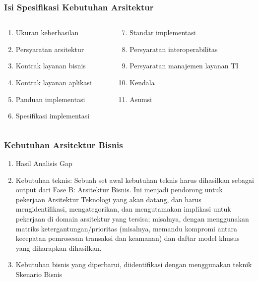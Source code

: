 \documentclass[aspectratio=169]{beamer}
\begin{document}
	\begin{frame}
		\frametitle{Isi Spesifikasi Kebutuhan Arsitektur}
		\begin{columns}
			\begin{column}{0.5\textwidth}
				\begin{center}
					\begin{enumerate}
						\item Ukuran keberhasilan
						\item Persyaratan arsitektur
						\item Kontrak layanan bisnis
						\item Kontrak layanan aplikasi
						\item Panduan implementasi
						\item Spesifikasi implementasi
						
					\end{enumerate}
				\end{center}
			\end{column}
			\begin{column}{0.5\textwidth}
				\begin{center}
					\begin{enumerate}
						\setcounter{enumi}{6}
						\item Standar implementasi
						\item Persyaratan interoperabilitas
						\item Persyaratan manajemen layanan TI
						\item Kendala
						\item Asumsi
					\end{enumerate}
				\end{center}
			\end{column}
		\end{columns}
	\end{frame}
	
		\begin{frame}
		\frametitle{Kebutuhan Arsitektur Bisnis}
		\begin{enumerate}
			\item Hasil Analisis Gap
			\item Kebutuhan teknis: Sebuah set awal kebutuhan teknis harus dihasilkan sebagai output dari Fase B: Arsitektur Bisnis. Ini menjadi pendorong untuk pekerjaan Arsitektur Teknologi yang akan datang, dan harus mengidentifikasi, mengategorikan, dan mengutamakan implikasi untuk pekerjaan di domain arsitektur yang tersisa; misalnya, dengan menggunakan matriks ketergantungan/prioritas (misalnya, memandu kompromi antara kecepatan pemrosesan transaksi dan keamanan) dan daftar model khusus yang diharapkan dihasilkan.
			\item Kebutuhan bisnis yang diperbarui, diidentifikasi dengan menggunakan teknik Skenario Bisnis
		\end{enumerate}
	\end{frame}	
	
\end{document}
